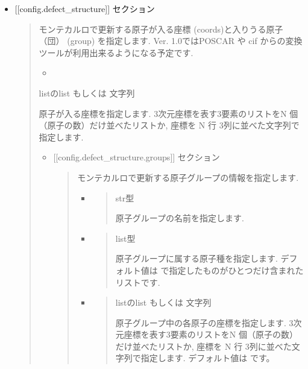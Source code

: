 \documentclass[letterpaper,10pt,dvipdfmx]{sphinxmanual}
\begin{document}
\begin{itemize}
\item {} 
{[}{[}config.defect\_structure{]}{]} セクション
\begin{quote}

モンテカルロで更新する原子が入る座標 (coords)と入りうる原子（団） (group) を指定します.
Ver. 1.0ではPOSCAR や cif からの変換ツールが利用出来るようになる予定です.
\begin{itemize}
\item {} 

\end{itemize}

 listのlist もしくは 文字列

  原子が入る座標を指定します.
3次元座標を表す3要素のリストをN 個（原子の数）だけ並べたリストか, 座標を N 行 3列に並べた文字列で指定します.
\begin{itemize}
\item {} 
{[}{[}config.defect\_structure.groups{]}{]} セクション
\begin{quote}

モンテカルロで更新する原子グループの情報を指定します.
\begin{itemize}
\item {} 
\begin{quote}

 str型

原子グループの名前を指定します.
\end{quote}

\item {} 
\begin{quote}

 list型

原子グループに属する原子種を指定します. デフォルト値は  で指定したものがひとつだけ含まれたリストです.
\end{quote}

\item {} 
\begin{quote}

 listのlist もしくは 文字列

  原子グループ中の各原子の座標を指定します.
3次元座標を表す3要素のリストをN 個（原子の数）だけ並べたリストか, 座標を N 行 3列に並べた文字列で指定します.
デフォルト値は \sphinxtitleref{{[}{[}0.0, 0.0, 0.0{]}{]}} です。
\end{quote}


\end{itemize}
\end{quote}
\end{itemize}
\end{quote}
\end{itemize}
\end{document}
